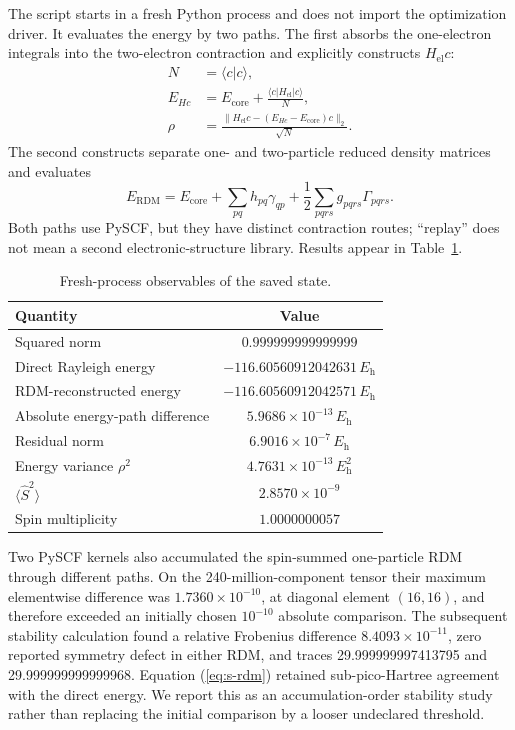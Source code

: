 \documentclass[aps,onecolumn,superscriptaddress,nofootinbib,longbibliography]{revtex4-2}
\newcommand{\Eh}{E_{\mathrm h}}
\begin{document}
The script  starts in a fresh Python
process and does not import the optimization driver.  It evaluates the energy
by two paths.  The first absorbs the one-electron integrals into the
two-electron contraction and explicitly constructs \(H_{\mathrm{el}}c\):
\begin{align}
 N&=\langle c|c\rangle,\\
 E_{Hc}&=E_{\mathrm{core}}+
 \frac{\langle c|H_{\mathrm{el}}|c\rangle}{N},\\
 \rho&=\frac{\lVert H_{\mathrm{el}}c-(E_{Hc}-E_{\mathrm{core}})c\rVert_2}
 {\sqrt N}.
\end{align}
The second constructs separate one- and two-particle reduced density matrices
and evaluates
\begin{equation}
 E_{\mathrm{RDM}}=E_{\mathrm{core}}
 +\sum_{pq}h_{pq}\gamma_{qp}
 +\frac{1}{2}\sum_{pqrs}g_{pqrs}\Gamma_{pqrs}.
 \label{eq:s-rdm}
\end{equation}
Both paths use PySCF, but they have distinct contraction routes; ``replay'' does
not mean a second electronic-structure library.  Results appear in
Table~\ref{tab:replay}.

\begin{table}[h]
\caption{Fresh-process observables of the saved state.}
\label{tab:replay}
\begin{ruledtabular}
\begin{tabular}{lc}
Quantity & Value \\
\hline
Squared norm & \(0.999999999999999\) \\
Direct Rayleigh energy & \(-116.60560912042631\,\Eh\) \\
RDM-reconstructed energy & \(-116.60560912042571\,\Eh\) \\
Absolute energy-path difference & \(5.9686\times10^{-13}\,\Eh\) \\
Residual norm & \(6.9016\times10^{-7}\,\Eh\) \\
Energy variance \(\rho^2\) & \(4.7631\times10^{-13}\,\Eh^2\) \\
\(\langle \hat S^2\rangle\) & \(2.8570\times10^{-9}\) \\
Spin multiplicity & \(1.0000000057\) \\
\end{tabular}
\end{ruledtabular}
\end{table}

Two PySCF kernels also accumulated the spin-summed one-particle RDM through
different paths.  On the 240-million-component tensor their maximum
elementwise difference was \(1.7360\times10^{-10}\), at diagonal element
\((16,16)\), and therefore exceeded an initially chosen \(10^{-10}\) absolute
comparison.  The subsequent stability calculation found a relative Frobenius
difference \(8.4093\times10^{-11}\), zero reported symmetry defect in either
RDM, and traces 29.999999997413795 and 29.999999999999968.  Equation
(\ref{eq:s-rdm}) retained sub-pico-Hartree agreement with the direct energy.
We report this as an accumulation-order stability study rather than replacing
the initial comparison by a looser undeclared threshold.
\end{document}
